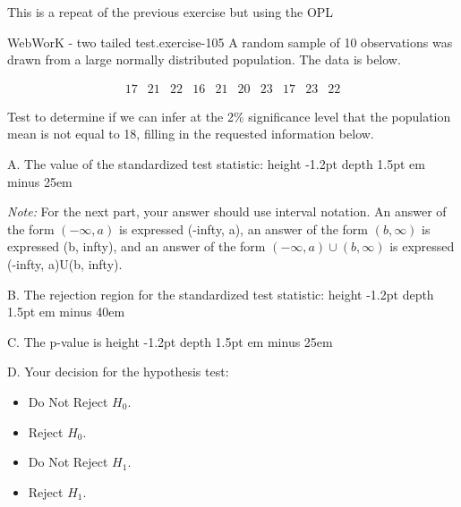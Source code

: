 \documentclass[10pt,]{book}
\newcommand{\fillin}[1]{\leavevmode\leaders\vrule height -1.2pt depth 1.5pt \hskip #1em minus #1em \null}
\numberwithin{equation}{section}
\newcommand{\amp}{&}
\begin{document}
%
\par
\hypertarget{p-1495}{}%
This is a repeat of the previous exercise but using the OPL \begin{inlineexercise}{WebWorK - two tailed test.}{exercise-105}%
\hypertarget{p-1496}{}%
A random sample of 10 observations was drawn from a large normally distributed population.  The data is below.%
\par
\hypertarget{p-1497}{}%
%
\begin{equation*}
\begin{array}{ccccccccccc} 
17 \amp  21 \amp  22 \amp  16 \amp  21 \amp  20 \amp  23 \amp  17 \amp  23 \amp  22 
\end{array}
\end{equation*}
%
\par
\hypertarget{p-1498}{}%
Test to determine if we can infer at the 2\% significance level that the population mean is not equal to 18, filling in the requested information below.%
\par
\hypertarget{p-1499}{}%
A. The value of the standardized test statistic:  \fillin{25}%
\par
\hypertarget{p-1500}{}%
\emph{Note:} For the next part, your answer should use interval notation.  An answer of the form \((-\infty, a)\) is expressed (-infty, a), an answer of the form \((b, \infty)\) is expressed (b, infty), and an answer of the form \((-\infty, a) \cup (b, \infty)\) is expressed (-infty, a)U(b, infty).%
\par
\hypertarget{p-1501}{}%
B. The rejection region for the standardized test statistic:  \fillin{40}%
\par
\hypertarget{p-1502}{}%
C. The p-value is  \fillin{25}%
\par
\hypertarget{p-1503}{}%
D. Your decision for the hypothesis test:%
\par
\hypertarget{p-1504}{}%
\par
\begin{itemize}[label=$\odot$,leftmargin=3em,]
\item{}\hypertarget{p-1505}{}%
Do Not Reject \(H_0\).%

\item{}\hypertarget{p-1506}{}%
Reject \(H_0\).%

\item{}\hypertarget{p-1507}{}%
Do Not Reject \(H_1\).%

\item{}\hypertarget{p-1508}{}%
Reject \(H_1\).%

\end{itemize}
%
\end{inlineexercise}
\end{document}
